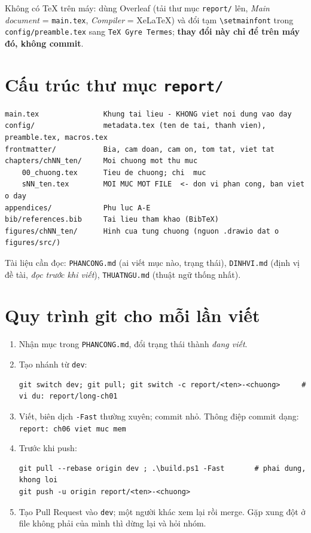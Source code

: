 \documentclass[11pt,a4paper]{article}
\newcommand{\file}[1]{\texttt{#1}}
\begin{document}
\smallskip
Không có TeX trên máy: dùng Overleaf (tải thư mục \file{report/} lên, \emph{Main document} = \verb+main.tex+, \emph{Compiler} = XeLaTeX) và đổi tạm \verb+\setmainfont+ trong \file{config/preamble.tex} sang \verb+TeX Gyre Termes+; \textbf{thay đổi này chỉ để trên máy đó, không commit}.

\section{Cấu trúc thư mục \file{report/}}
\begin{lstlisting}
main.tex               Khung tai lieu - KHONG viet noi dung vao day
config/                metadata.tex (ten de tai, thanh vien), preamble.tex, macros.tex
frontmatter/           Bia, cam doan, cam on, tom tat, viet tat
chapters/chNN_ten/     Moi chuong mot thu muc
    00_chuong.tex      Tieu de chuong; chi  muc
    sNN_ten.tex        MOI MUC MOT FILE  <- don vi phan cong, ban viet o day
appendices/            Phu luc A-E
bib/references.bib     Tai lieu tham khao (BibTeX)
figures/chNN_ten/      Hinh cua tung chuong (nguon .drawio dat o figures/src/)
\end{lstlisting}
Tài liệu cần đọc: \file{PHANCONG.md} (ai viết mục nào, trạng thái), \file{DINHVI.md} (định vị đề tài, \emph{đọc trước khi viết}), \file{THUATNGU.md} (thuật ngữ thống nhất).

\newpage
\section{Quy trình git cho mỗi lần viết}
\begin{enumerate}
  \item Nhận mục trong \file{PHANCONG.md}, đổi trạng thái thành \emph{đang viết}.
  \item Tạo nhánh từ \verb+dev+:
\begin{lstlisting}
git switch dev; git pull; git switch -c report/<ten>-<chuong>     # vi du: report/long-ch01
\end{lstlisting}
  \item Viết, biên dịch \verb+-Fast+ thường xuyên; commit nhỏ. Thông điệp commit dạng:\\ \verb+report: ch06 viet muc mem+
  \item Trước khi push:
\begin{lstlisting}
git pull --rebase origin dev ; .\build.ps1 -Fast       # phai dung, khong loi
git push -u origin report/<ten>-<chuong>
\end{lstlisting}
  \item Tạo Pull Request vào \verb+dev+; một người khác xem lại rồi merge. Gặp xung đột ở file không phải của mình thì dừng lại và hỏi nhóm.
\end{enumerate}
\end{document}
